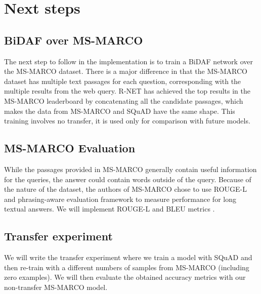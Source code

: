 \documentclass[11pt,a4paper]{article}
\begin{document}
\section{Next steps}
\label{sec:next_steps}

\subsection {BiDAF over MS-MARCO }

The next step to follow in the implementation is to train a BiDAF network over the MS-MARCO dataset. There is a major difference in that the MS-MARCO dataset has multiple text passages for each question, corresponding with the multiple results from the web query. R-NET has achieved the top results in the MS-MARCO leaderboard by concatenating all the candidate passages, which makes the data from MS-MARCO and SQuAD have the same shape. This training involves no transfer, it is used only for comparison with future models.

\subsection {MS-MARCO Evaluation}

While the passages provided in MS-MARCO generally contain useful information for the queries, the answer could contain words outside of the query. Because of the nature of the dataset, the authors of MS-MARCO chose to use ROUGE-L and phrasing-aware evaluation framework to measure performance for long textual answers. We will implement ROUGE-L and BLEU metrics \cite{msmarco:2016}.

\subsection{Transfer experiment}

We will write the transfer experiment where we train a model with SQuAD and then re-train with a different numbers of samples from MS-MARCO (including zero examples). We will then evaluate the obtained accuracy metrics with our non-transfer MS-MARCO model. 




%
%


\end{document}
